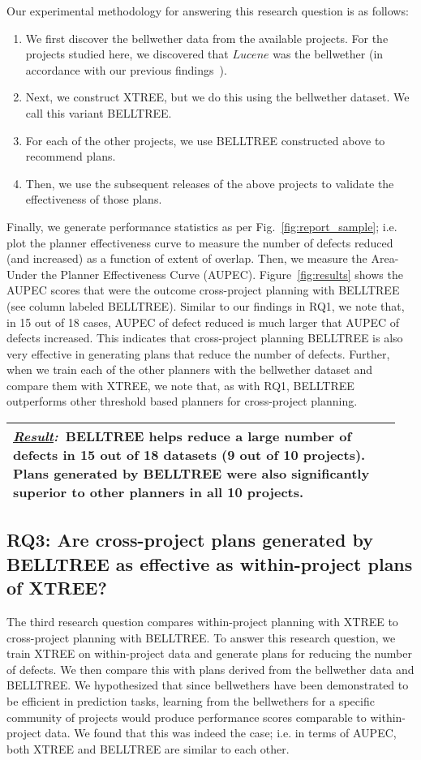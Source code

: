 \documentclass[10pt, journal, compsoc]{IEEEtran}
\newcommand{\result}[1]{
\vspace{0.2cm}
\noindent\begin{minipage}{\linewidth}
\begin{tabular}{|p{0.95\linewidth}|}
\hline\vspace{-0.2cm}
\textbf{\textit{\underline{Result}:}}~#1\\\hline
\end{tabular}
\end{minipage}\bigstrut
}
\newcommand{\be}{\begin{enumerate}}
\newcommand{\ee}{\end{enumerate}}
\newcommand{\fig}[1]{Fig.~\ref{fig:#1}}
\begin{document}
Our experimental methodology for answering this research question is as follows:
\be
  \item We first discover the bellwether data from the available projects. For the projects studied here, we discovered that $Lucene$ was the bellwether (in accordance with our previous findings~\cite{krishna16, krishna17b}).
  \item Next, we construct XTREE, but we do this using the bellwether dataset. We call this variant BELLTREE.
  \item For each of the other projects, we use BELLTREE constructed above to recommend plans.
  \item Then, we use the subsequent releases of the above projects to validate the effectiveness of those plans.
\ee

Finally, we generate performance statistics as per \fig{report_sample}; i.e. plot the planner effectiveness curve to measure the number of defects reduced (and increased) as a function of extent of overlap. Then, we measure the Area-Under the Planner Effectiveness Curve (AUPEC). Figure~\ref{fig:results}\protect{} shows the AUPEC scores that were the outcome cross-project planning with BELLTREE (see column labeled BELLTREE). Similar to our findings in RQ1, we note that, in 15 out of 18 cases, AUPEC of defect reduced is much larger that AUPEC of defects increased. This indicates that cross-project planning BELLTREE is also very effective in generating plans that reduce the number of defects. Further, when we train each of the other planners with the bellwether dataset and compare them with XTREE, we note that, as with RQ1, BELLTREE outperforms other threshold based planners for cross-project planning. 

\result{BELLTREE helps reduce a large number of defects in 15 out of 18 datasets (9 out of 10 projects). Plans generated by BELLTREE were also significantly superior to other planners in all 10 projects.}

\subsection*{{\bf RQ3: Are cross-project plans generated by BELLTREE as effective as within-project plans of XTREE?}}

The third research question compares within-project planning with XTREE to cross-project planning with BELLTREE. To answer this research question, we train XTREE on within-project data and generate plans for reducing the number of defects. We then compare this with plans derived from the bellwether data and BELLTREE. We hypothesized that since bellwethers have been demonstrated to be efficient in prediction tasks, learning from the bellwethers for a specific community of projects would produce performance scores comparable to within-project data. We found that this was indeed the case; i.e. in terms of AUPEC, both XTREE and BELLTREE are similar to each other.
\end{document}
